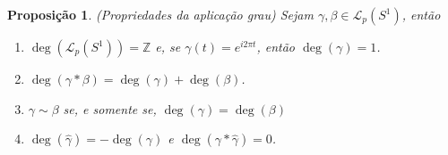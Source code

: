 \documentclass[12pt]{book}
\newtheorem{proposicao}[teorema]{Proposição}
\newcommand{\caminhos}{\mathcal{L}}
\newcommand{\caminhospontobasegeral}[2]{\caminhos_{#1}(#2)}
\newcommand{\circulo}{S^{1}}
\newcommand{\inteiros}{\mathbb{Z}}
\begin{document}
	\begin{proposicao}\label{proposicao_grau_aplicacao}
		(Propriedades da aplicação grau) Sejam $\gamma, \beta \in \caminhospontobasegeral{p}{\circulo}$, então
		\begin{enumerate}
			\item $\deg(\caminhospontobasegeral{p}{\circulo}) = \inteiros$ e, se $\gamma(t) = e^{i2\pi t}$, então $\deg(\gamma) = 1$.
			
			\item $\deg(\gamma*\beta)=\deg(\gamma)+\deg(\beta)$.
			
			\item $\gamma\sim \beta$ se, e somente se, $\deg(\gamma)=\deg(\beta)$
			
			
			\item $\deg(\hat{\gamma} ) = -\deg(\gamma)$ e $\deg(\gamma*\hat{\gamma} ) = 0$.
			
		\end{enumerate}
	\end{proposicao}
\end{document}
